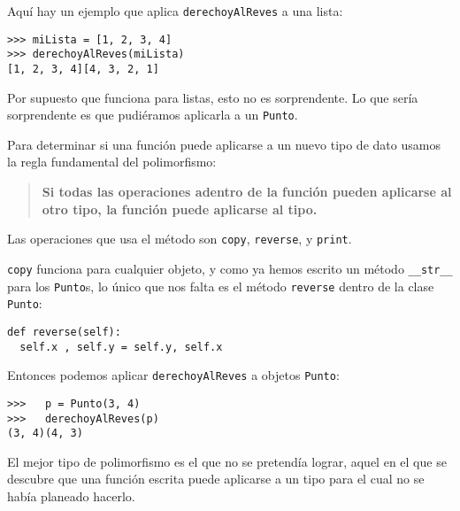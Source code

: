 Aquí hay un ejemplo que aplica \texttt{derechoyAlReves} a una lista:

\begin{verbatim}
>>> miLista = [1, 2, 3, 4]
>>> derechoyAlReves(miLista)
[1, 2, 3, 4][4, 3, 2, 1]
\end{verbatim}
 Por supuesto que funciona para listas, esto no es sorprendente. Lo
que sería sorprendente es que pudiéramos aplicarla a un \texttt{Punto}.

Para determinar si una función puede aplicarse a un nuevo tipo de
dato usamos la regla fundamental del polimorfismo:
\begin{quote}
\textbf{Si todas las operaciones adentro de la función pueden aplicarse
al otro tipo, la función puede aplicarse al tipo.} 
\end{quote}
Las operaciones que usa el método son \texttt{copy}, \texttt{reverse},
y \texttt{print}.

\texttt{copy} funciona para cualquier objeto, y como ya hemos escrito
un método \texttt{\_\_str\_\_} para los \texttt{Punto}s, lo único
que nos falta es el método \texttt{reverse} dentro de la clase \texttt{Punto}:

\begin{verbatim}
def reverse(self):
  self.x , self.y = self.y, self.x
\end{verbatim}
 Entonces podemos aplicar \texttt{derechoyAlReves} a objetos \texttt{Punto}:

\begin{verbatim}
>>>   p = Punto(3, 4)
>>>   derechoyAlReves(p)
(3, 4)(4, 3)
\end{verbatim}
 El mejor tipo de polimorfismo es el que no se pretendía lograr, aquel
en el que se descubre que una función escrita puede aplicarse a un
tipo para el cual no se había planeado hacerlo.

